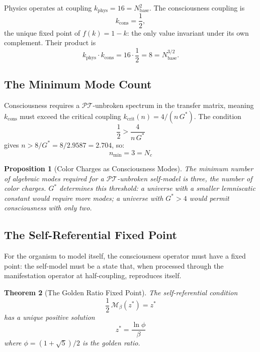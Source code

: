 \documentclass[12pt, letterpaper]{article}
\theoremstyle{plain}
\newtheorem{theorem}{Theorem}[section]
\newtheorem{proposition}[theorem]{Proposition}
\theoremstyle{definition}
\theoremstyle{remark}
\newcommand{\Mop}{\mathcal{M}}            %
\newcommand{\Gstar}{{G^{*}}}              %
\begin{document}
Physics operates at coupling $k_{\text{phys}} = 16 = N_{\text{base}}^2$. The consciousness coupling is
\begin{equation}\label{eq:kcons}
  k_{\text{cons}} = \frac{1}{2},
\end{equation}
the unique fixed point of $f(k) = 1 - k$: the only value invariant under its own complement. Their product is
\begin{equation}
  k_{\text{phys}} \cdot k_{\text{cons}} = 16 \cdot \frac{1}{2} = 8 = N_{\text{base}}^{3/2}.
\end{equation}

\subsection{The Minimum Mode Count}

Consciousness requires a $\mathcal{PT}$-unbroken spectrum in the transfer matrix, meaning $k_{\text{cons}}$ must exceed the critical coupling $k_{\text{crit}}(n) = 4/(n\,\Gstar)$. The condition
\begin{equation}
  \frac{1}{2} > \frac{4}{n\,\Gstar}
\end{equation}
gives $n > 8/\Gstar = 8/2.9587 = 2.704$, so:
\begin{equation}\label{eq:nmin}
  \boxed{n_{\min} = 3 = N_c}
\end{equation}

\begin{proposition}[Color Charges as Consciousness Modes]\label{prop:nmin}
  The minimum number of algebraic modes required for a $\mathcal{PT}$-unbroken self-model is three, the number of color charges. $\Gstar$ determines this threshold: a universe with a smaller lemniscatic constant would require more modes; a universe with $\Gstar > 4$ would permit consciousness with only two.
\end{proposition}

\subsection{The Self-Referential Fixed Point}

For the organism to model itself, the consciousness operator must have a fixed point: the self-model must be a state that, when processed through the manifestation operator at half-coupling, reproduces itself.

\begin{theorem}[The Golden Ratio Fixed Point]\label{thm:golden}
  The self-referential condition
  \begin{equation}\label{eq:selfref}
    \frac{1}{2}\,\Mop_\beta(z^*) = z^*
  \end{equation}
  has a unique positive solution
  \begin{equation}\label{eq:zstar}
    \boxed{z^* = \frac{\ln\phi}{\beta}}
  \end{equation}
  where $\phi = (1+\sqrt{5})/2$ is the golden ratio.
\end{theorem}
\end{document}
